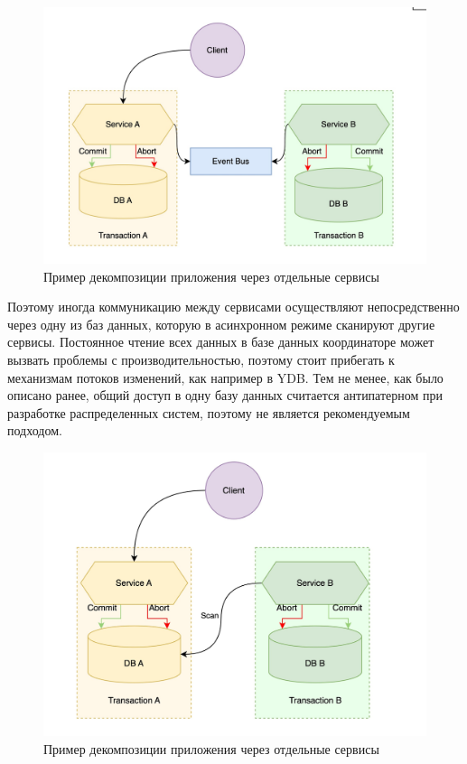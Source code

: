 \begin{figure}[H]
    \centering
    \includegraphics[width=0.8\linewidth]{img/saga_async.jpeg}
    \caption{Пример декомпозиции приложения через отдельные сервисы}
    \label{fig:y}
\end{figure}

Поэтому иногда коммуникацию между сервисами осуществляют непосредственно через одну из баз данных, которую в асинхронном режиме
сканируют другие сервисы. Постоянное чтение всех данных в базе данных координаторе может вызвать проблемы с производительностью, поэтому 
стоит прибегать к механизмам потоков изменений, как например в YDB. Тем не менее, как было описано ранее, общий доступ в одну базу данных
считается антипатерном при разработке распределенных систем, поэтому не является рекомендуемым подходом.

\begin{figure}[H]
    \centering
    \includegraphics[width=0.8\linewidth]{img/saga_scan.jpeg}
    \caption{Пример декомпозиции приложения через отдельные сервисы}
    \label{fig:y}
\end{figure}


